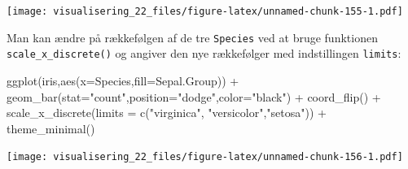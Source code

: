 \documentclass[
]{book}
\newenvironment{Shaded}{\begin{snugshade}}{\end{snugshade}}
\newcommand{\AttributeTok}[1]{\textcolor[rgb]{0.77,0.63,0.00}{#1}}
\newcommand{\CommentTok}[1]{\textcolor[rgb]{0.56,0.35,0.01}{\textit{#1}}}
\newcommand{\FunctionTok}[1]{\textcolor[rgb]{0.00,0.00,0.00}{#1}}
\newcommand{\NormalTok}[1]{#1}
\newcommand{\OtherTok}[1]{\textcolor[rgb]{0.56,0.35,0.01}{#1}}
\newcommand{\SpecialCharTok}[1]{\textcolor[rgb]{0.00,0.00,0.00}{#1}}
\newcommand{\StringTok}[1]{\textcolor[rgb]{0.31,0.60,0.02}{#1}}
\begin{document}
\begin{Shaded}
\end{Shaded}

\texttt{[image: visualisering\_22\_files/figure-latex/unnamed-chunk-155-1.pdf]}

Man kan ændre på rækkefølgen af de tre \texttt{Species} ved at bruge funktionen \texttt{scale\_x\_discrete()} og angiver den nye rækkefølger med indstillingen \texttt{limits}:

\begin{Shaded}
\begin{Highlighting}[]
\FunctionTok{ggplot}\NormalTok{(iris,}\FunctionTok{aes}\NormalTok{(}\AttributeTok{x=}\NormalTok{Species,}\AttributeTok{fill=}\NormalTok{Sepal.Group)) }\SpecialCharTok{+} 
  \FunctionTok{geom\_bar}\NormalTok{(}\AttributeTok{stat=}\StringTok{"count"}\NormalTok{,}\AttributeTok{position=}\StringTok{"dodge"}\NormalTok{,}\AttributeTok{color=}\StringTok{"black"}\NormalTok{) }\SpecialCharTok{+}
  \FunctionTok{coord\_flip}\NormalTok{() }\SpecialCharTok{+}
  \FunctionTok{scale\_x\_discrete}\NormalTok{(}\AttributeTok{limits =} \FunctionTok{c}\NormalTok{(}\StringTok{"virginica"}\NormalTok{, }\StringTok{"versicolor"}\NormalTok{,}\StringTok{"setosa"}\NormalTok{)) }\SpecialCharTok{+}
  \FunctionTok{theme\_minimal}\NormalTok{()}
\end{Highlighting}
\end{Shaded}

\texttt{[image: visualisering\_22\_files/figure-latex/unnamed-chunk-156-1.pdf]}
\end{document}
